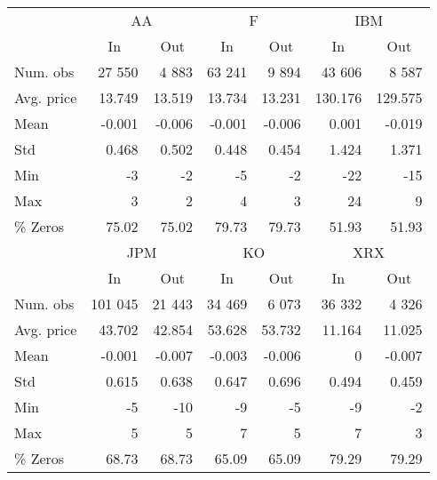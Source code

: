 \tabcolsep=0.07cm
\begin{singlespace}
\begin{tabular}{lrrrrrr} \toprule 
 & \multicolumn{2}{c}{AA}& \multicolumn{2}{c}{F}& \multicolumn{2}{c}{IBM} \\ 
\cmidrule(r){2-3} \cmidrule(r){4-5} \cmidrule(r){6-7} &  \multicolumn{1}{c}{In}&  \multicolumn{1}{c}{ Out}&  \multicolumn{1}{c}{In}&  \multicolumn{1}{c}{ Out}&  \multicolumn{1}{c}{In}&  \multicolumn{1}{c}{ Out} \\ \midrule 
 Num. obs&27 550&4 883&63 241&9 894&43 606&8 587 \\ 
Avg. price&13.749&13.519&13.734&13.231& 130.176& 129.575 \\ 
Mean&-0.001&-0.006&-0.001&-0.006&0.001&-0.019 \\ 
Std&0.468&0.502&0.448&0.454&1.424&1.371 \\ 
Min&-3&-2&-5&-2&-22&-15 \\ 
Max&3&2&4&3&24&9 \\ 
\% Zeros&75.02&75.02&79.73&79.73&51.93&51.93 \\ \midrule 
 & \multicolumn{2}{c}{JPM}& \multicolumn{2}{c}{KO}& \multicolumn{2}{c}{XRX} \\ 
\cmidrule(r){2-3} \cmidrule(r){4-5} \cmidrule(r){6-7} &  \multicolumn{1}{c}{In}&  \multicolumn{1}{c}{Out}&  \multicolumn{1}{c}{In}&  \multicolumn{1}{c}{Out}&  \multicolumn{1}{c}{In}&  \multicolumn{1}{c}{Out} \\ \midrule 
 Num. obs& 101 045&21 443&34 469&6 073&36 332&4 326 \\ 
Avg. price&43.702&42.854&53.628&53.732&11.164&11.025 \\ 
Mean&-0.001&-0.007&-0.003&-0.006&0&-0.007 \\ 
Std&0.615&0.638&0.647&0.696&0.494&0.459 \\ 
Min&-5&-10&-9&-5&-9&-2 \\ 
Max&5&5&7&5&7&3 \\ 
\% Zeros&68.73&68.73&65.09&65.09&79.29&79.29 \\ \bottomrule 
\end{tabular}
\end{singlespace}
